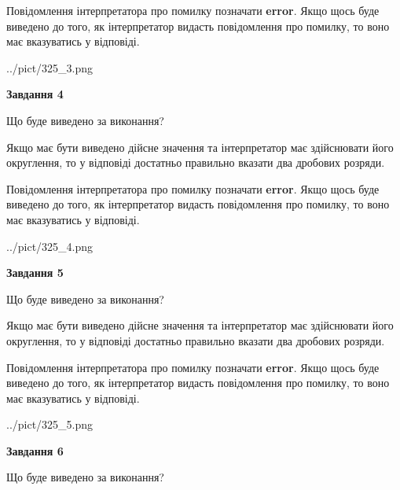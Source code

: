 \documentclass[12pt, ukrainian]{article}
\begin{document}
{\begin {Large}
Повідомлення інтерпретатора про помилку позначати \textbf{error}.
Якщо щось буде виведено до того, як інтерпретатор видасть повідомлення про помилку, 
то воно має вказуватись у відповіді. \par

\begin{center}
	{../pict/325_3.png}
\end{center}
\newpage

{\begin {center}\textbf{Завдання 4}\end {center}}\par
Що буде виведено за виконання? \par

Якщо має бути виведено дійсне значення та інтерпретатор має здійснювати його округлення, 
то у відповіді достатньо правильно вказати два дробових розряди.

Повідомлення інтерпретатора про помилку позначати \textbf{error}.
Якщо щось буде виведено до того, як інтерпретатор видасть повідомлення про помилку, 
то воно має вказуватись у відповіді. \par

\begin{center}
	{../pict/325_4.png}
\end{center}
\newpage

{\begin {center}\textbf{Завдання 5}\end {center}}\par
Що буде виведено за виконання? \par

Якщо має бути виведено дійсне значення та інтерпретатор має здійснювати його округлення, 
то у відповіді достатньо правильно вказати два дробових розряди.

Повідомлення інтерпретатора про помилку позначати \textbf{error}.
Якщо щось буде виведено до того, як інтерпретатор видасть повідомлення про помилку, 
то воно має вказуватись у відповіді. \par

\begin{center}
	{../pict/325_5.png}
\end{center}
\newpage

{\begin {center}\textbf{Завдання 6}\end {center}}\par
Що буде виведено за виконання? \par


\end{Large}}
\end{document}
